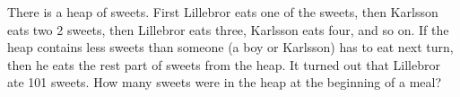 \problem
There is a heap of sweets.
First Lillebror eats one of the sweets, then Karlsson eats two 2 sweets, then
Lillebror eats three, Karlsson eats four, and so on.
If the heap contains less sweets than someone (a boy or Karlsson) has to eat
next turn, then he eats the rest part of sweets from the heap.
It turned out that Lillebror ate 101 sweets.
How many sweets were in the heap at the beginning of a meal?

\solution

\endproblem
